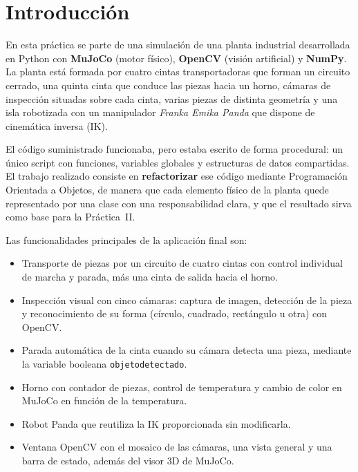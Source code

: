 \documentclass[12pt,a4paper]{article}
\renewcommand{\_}{\guionbajo\allowbreak}
\begin{document}

\section{Introducción}

En esta práctica se parte de una simulación de una planta industrial desarrollada en
Python con \textbf{MuJoCo} (motor físico), \textbf{OpenCV} (visión artificial) y
\textbf{NumPy}. La planta está formada por cuatro cintas transportadoras que forman un
circuito cerrado, una quinta cinta que conduce las piezas hacia un horno, cámaras de
inspección situadas sobre cada cinta, varias piezas de distinta geometría y una isla
robotizada con un manipulador \textit{Franka Emika Panda} que dispone de cinemática
inversa (IK).

El código suministrado funcionaba, pero estaba escrito de forma procedural: un único
script con funciones, variables globales y estructuras de datos compartidas. El trabajo
realizado consiste en \textbf{refactorizar} ese código mediante Programación Orientada a
Objetos, de manera que cada elemento físico de la planta quede representado por una clase
con una responsabilidad clara, y que el resultado sirva como base para la Práctica~II.

Las funcionalidades principales de la aplicación final son:

\begin{itemize}[leftmargin=1.2cm]
    \item Transporte de piezas por un circuito de cuatro cintas con control individual de
          marcha y parada, más una cinta de salida hacia el horno.
    \item Inspección visual con cinco cámaras: captura de imagen, detección de la pieza y
          reconocimiento de su forma (círculo, cuadrado, rectángulo u otra) con OpenCV.
    \item Parada automática de la cinta cuando su cámara detecta una pieza, mediante la
          variable booleana \texttt{objeto\_detectado}.
    \item Horno con contador de piezas, control de temperatura y cambio de color en MuJoCo
          en función de la temperatura.
    \item Robot Panda que reutiliza la IK proporcionada sin modificarla.
    \item Ventana OpenCV con el mosaico de las cámaras, una vista general y una barra de
          estado, además del visor 3D de MuJoCo.
\end{itemize}
\end{document}
